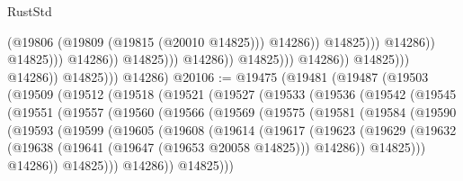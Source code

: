 \begin{lexlean}{RustStd}
\begin{coremodule}
                                                                (@19806
                                                                  (@19809 (@19815 (@20010 @14825)))
                                                                  @14286))
                                                              @14825)))
                                                        @14286))
                                                    @14825)))
                                              @14286))
                                          @14825)))
                                    @14286))
                                @14825)))
                          @14286))
                      @14825)))
                @14286))
            @14825)))
      @14286)
@20106 := @19475
    (@19481
      (@19487
        (@19503
          (@19509
            (@19512
              (@19518
                (@19521
                  (@19527
                    (@19533
                      (@19536
                        (@19542
                          (@19545
                            (@19551
                              (@19557
                                (@19560
                                  (@19566
                                    (@19569
                                      (@19575
                                        (@19581
                                          (@19584
                                            (@19590
                                              (@19593
                                                (@19599
                                                  (@19605
                                                    (@19608
                                                      (@19614
                                                        (@19617
                                                          (@19623
                                                            (@19629
                                                              (@19632
                                                                (@19638
                                                                  (@19641
                                                                    (@19647 (@19653 @20058 @14825)))
                                                                  @14286))
                                                              @14825)))
                                                        @14286))
                                                    @14825)))
                                              @14286))
                                          @14825)))

\end{coremodule}
\end{lexlean}
